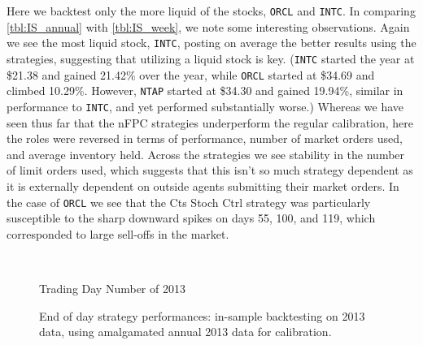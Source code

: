 Here we backtest only the more liquid of the stocks, \texttt{ORCL} and \texttt{INTC}. In comparing \autoref{tbl:IS_annual} with \autoref{tbl:IS_week}, we note some interesting observations. Again we see the most liquid stock, \texttt{INTC}, posting on average the better results using the strategies, suggesting that utilizing a liquid stock is key.  (\texttt{INTC} started the year at \$21.38 and gained 21.42\% over the year, while \texttt{ORCL} started at \$34.69 and climbed 10.29\%. However, \texttt{NTAP} started at \$34.30 and gained 19.94\%, similar in performance to \texttt{INTC}, and yet performed substantially worse.) Whereas we have seen thus far that the nFPC strategies underperform the regular calibration, here the roles were reversed in terms of performance, number of market orders used, and average inventory held. Across the strategies we see stability in the number of limit orders used, which suggests that this isn't so much strategy dependent as it is externally dependent on outside agents submitting their market orders. In the case of \texttt{ORCL} we see that the Cts Stoch Ctrl strategy was particularly susceptible to the sharp downward spikes on days 55, 100, and 119, which corresponded to large sell-offs in the market. 


\begin{figure}
\centering
\begin{subfigure}{.45\linewidth}
  \centering
  \setlength\figureheight{\linewidth} 
  \setlength\figurewidth{\linewidth}
  
\end{subfigure}%
\hfill%
\begin{subfigure}{.45\linewidth}
  \centering
  \setlength\figureheight{\linewidth} 
  \setlength\figurewidth{\linewidth}
   
\end{subfigure}\\

\leavevmode{}\hspace{0pt plus 1filll}\null

Trading Day Number of 2013

\vspace{1cm}
\begin{subfigure}{\linewidth}
  \setlength\figureheight{\linewidth} 
  \setlength\figurewidth{\linewidth}
  \resizebox{\linewidth}{!}{}
\end{subfigure}%
  \caption{End of day strategy performances: in-sample backtesting on 2013 data, using amalgamated annual 2013 data for calibration.}
  \label{fig:IS_annual_comp}
\end{figure}


